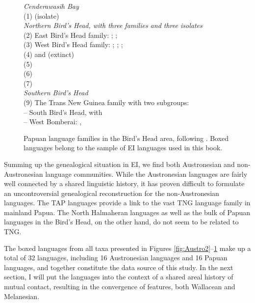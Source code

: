 \begin{figure}[ht]
{\raggedright%
\begin{footnotesize}
\textit{Cenderawasih Bay} \\
(1)  (isolate) \bigskip\\
\textit{Northern Bird’s Head, with three families and three isolates} \\
(2) East Bird’s Head family: ; ;  \\
(3) West Bird’s Head family: ; ; ;  \\
(4)  and (extinct)  \\
(5)  \\
(6)  \\
(7)  \bigskip\\
\textit{Southern Bird’s Head} \\
(9) The Trans New Guinea family with two subgroups: \\
– South Bird’s Head, with  \\
– West Bomberai: ,  \\
\end{footnotesize}}
\caption[The Papuan languages of the Bird's Head]{Papuan language families in the Bird's Head area, following \citet{klamer2008east}. Boxed languages belong to the sample of EI languages used in this book.}\label{fig:westpapuan}
\end{figure}

Summing up the genealogical situation in EI, we find both Austronesian and non-Austronesian language communities. While the Austronesian languages are fairly well connected by a shared linguistic history, it has proven difficult to formulate an uncontroversial genealogical reconstruction for the non-Austronesian languages. The TAP languages provide a link to the vast TNG language family in mainland Papua. The North Halmaheran languages as well as the bulk of Papuan languages in the Bird's Head, on the other hand, do not seem to be related to TNG. 

The boxed languages from all taxa presented in Figures \ref{fig:Austro2}--\ref{fig:westpapuan} make up a total of 32 languages, including 16 Austronesian languages and 16 Papuan languages, and together constitute the data source of this study. In the next section, I will put the languages into the context of a shared areal history of mutual contact, resulting in the convergence of features, both Wallacean and Melanesian.

